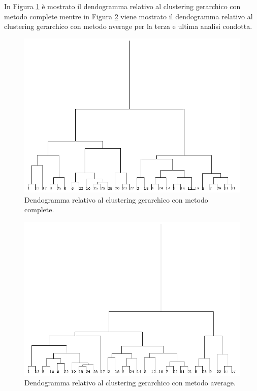 \documentclass[12pt]{article}
\begin{document}
In Figura \ref{fig:dendo-complete3} è mostrato il dendogramma relativo al clustering gerar\-chico con metodo complete mentre in Figura \ref{fig:dendo-average3} viene mostrato il dendo\-gramma relativo al clustering gerarchico con metodo average per la terza e ultima analisi condotta.
\begin{figure}[H]
	\includegraphics[width=\textwidth]{img/c-gerarchico-vmedio-test-complete.png}
	\caption{Dendogramma relativo al clustering gerarchico con metodo complete.}
	\label{fig:dendo-complete3}
\end{figure}
\begin{figure}[H]
	\includegraphics[width=\textwidth]{img/c-gerarchico-vmedio-test-average.png}
	\caption{Dendogramma relativo al clustering gerarchico con metodo average.}
	\label{fig:dendo-average3}
\end{figure}
\newpage
\end{document}
